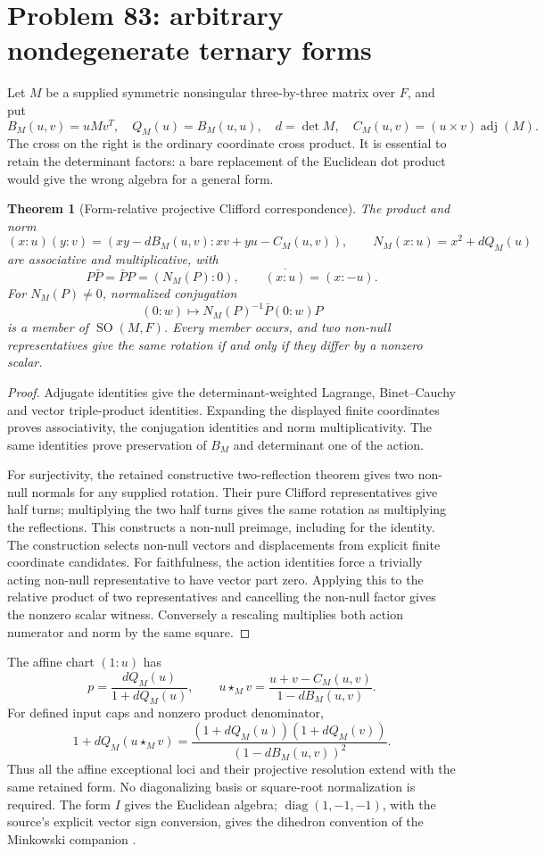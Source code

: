 \documentclass[11pt]{article}
\newcommand{\SO}{\operatorname{SO}}
\newcommand{\adj}{\operatorname{adj}}
\newtheorem{theorem}{Theorem}[section]
\theoremstyle{remark}
\begin{document}
\section{Problem 83: arbitrary nondegenerate ternary forms}

Let \(M\) be a supplied symmetric nonsingular three-by-three matrix over
\(F\), and put
\[
 B_M(u,v)=uMv^T,\quad Q_M(u)=B_M(u,u),\quad d=\det M,
 \quad C_M(u,v)=(u\times v)\adj(M).
\]
The cross on the right is the ordinary coordinate cross product. It is
essential to retain the determinant factors: a bare replacement of the
Euclidean dot product would give the wrong algebra for a general form.

\begin{theorem}[Form-relative projective Clifford correspondence]
The product and norm
\[
 (x:u)(y:v)=(xy-dB_M(u,v):xv+yu-C_M(u,v)),
 \qquad N_M(x:u)=x^2+dQ_M(u)
\]
are associative and multiplicative, with
\[
 P\bar P=\bar PP=(N_M(P):0),\qquad\overline{(x:u)}=(x:-u).
\]
For \(N_M(P)\ne0\), normalized conjugation
\[
 (0:w)\longmapsto N_M(P)^{-1}\bar P(0:w)P
\]
is a member of \(\SO(M,F)\). Every member occurs, and two non-null
representatives give the same rotation if and only if they differ by a
nonzero scalar.
\end{theorem}
\begin{proof}
Adjugate identities give the determinant-weighted Lagrange,
Binet--Cauchy and vector triple-product identities. Expanding the displayed
finite coordinates proves associativity, the conjugation identities and
norm multiplicativity. The same identities prove preservation of \(B_M\)
and determinant one of the action.

For surjectivity, the retained constructive two-reflection theorem gives
two non-null normals for any supplied rotation. Their pure Clifford
representatives give half turns; multiplying the two half turns gives the
same rotation as multiplying the reflections. This constructs a non-null
preimage, including for the identity. The construction selects non-null
vectors and displacements from explicit finite coordinate candidates.
For faithfulness, the action identities force a trivially acting non-null
representative to have vector part zero. Applying this to the relative
product of two representatives and cancelling the non-null factor gives the
nonzero scalar witness. Conversely a rescaling multiplies both action
numerator and norm by the same square.
\end{proof}

The affine chart \((1:u)\) has
\[
 p=\frac{dQ_M(u)}{1+dQ_M(u)},\qquad
 u\star_Mv=\frac{u+v-C_M(u,v)}{1-dB_M(u,v)}.
\]
For defined input caps and nonzero product denominator,
\[
 1+dQ_M(u\star_Mv)=
 \frac{(1+dQ_M(u))(1+dQ_M(v))}{(1-dB_M(u,v))^2}.
\]
Thus all the affine exceptional loci and their projective resolution extend
with the same retained form. No diagonalizing basis or square-root
normalization is required. The form \(I\) gives the Euclidean algebra;
\(\operatorname{diag}(1,-1,-1)\), with the source's explicit vector sign
conversion, gives the dihedron convention of the Minkowski companion
\cite{companion}.
\end{document}
